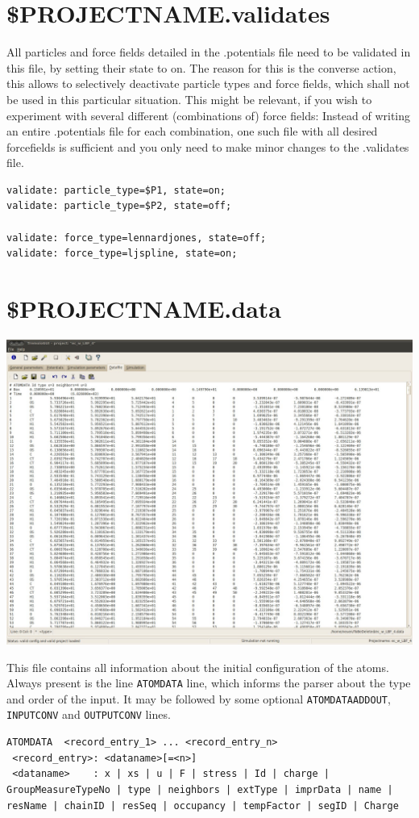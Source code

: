 
\section{\$PROJECTNAME.validates}
\label{.validates}

All particles and force fields detailed in the .potentials file need to be validated in this file, by setting their state to on. The reason for this is the converse action, this allows to selectively deactivate particle types and force fields, which shall not be used in this particular situation. This might be relevant, if you wish to experiment with several different (combinations of) force fields: Instead of writing an entire .potentials file for each combination, one such file with all desired forcefields is sufficient and you only need to make minor changes to the .validates file.

\begin{lstlisting}
validate: particle_type=$P1, state=on;
validate: particle_type=$P2, state=off;

validate: force_type=lennardjones, state=off;
validate: force_type=ljspline, state=on;
\end{lstlisting}


\section{\$PROJECTNAME.data}
\label{.data}
\includegraphics[width=15cm]{visuals/GUI_Data.jpg}

This file contains all information about the initial configuration of the atoms. Always present is the line \texttt{ATOMDATA} line, which informs the parser about the type and order of the input. It may be followed by some optional \texttt{ATOMDATAADDOUT}, \texttt{INPUTCONV} and \texttt{OUTPUTCONV} lines.
\begin{lstlisting}
ATOMDATA  <record_entry_1> ... <record_entry_n>
 <record_entry>: <dataname>[=<n>]
 <dataname>    : x | xs | u | F | stress | Id | charge | GroupMeasureTypeNo | type | neighbors | extType | imprData | name | resName | chainID | resSeq | occupancy | tempFactor | segID | Charge
               
\end{lstlisting}



